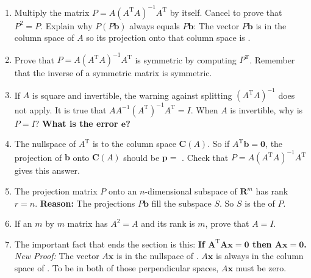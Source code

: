 \documentclass[14pt, a4paper]{article}
\begin{document}
\begin{enumerate}[resume]
    \item Multiply the matrix $P = A(A^{\mathrm{T}}A)^{-1}A^{\mathrm{T}}$ by itself. Cancel to prove that $P^2 = P$. Explain why $P(P\boldsymbol{b})$ always equals $P\boldsymbol{b}$: The vector $P\boldsymbol{b}$ is in the column space of $A$ so its projection onto that column space is \underline{\hspace{2cm}}.

    \item Prove that $P = A(A^{\mathrm{T}}A)^{-1}A^{\mathrm{T}}$ is symmetric by computing $P^{\mathrm{T}}$. Remember that the inverse of a symmetric matrix is symmetric.

    \item If $A$ is square and invertible, the warning against splitting $(A^{\mathrm{T}}A)^{-1}$ does not apply. It is true that $AA^{-1}(A^{\mathrm{T}})^{-1}A^{\mathrm{T}} = I$. When $A$ is invertible, why is $P = I$? \textbf{What is the error $\boldsymbol{e}$?}

    \item The nullspace of $A^{\mathrm{T}}$ is \underline{\hspace{2cm}} to the column space $\mathbf{C}(A)$. So if $A^{\mathrm{T}}\boldsymbol{b} = \boldsymbol{0}$, the projection of $\boldsymbol{b}$ onto $\mathbf{C}(A)$ should be $\boldsymbol{p} = $ \underline{\hspace{2cm}}. Check that $P = A(A^{\mathrm{T}}A)^{-1}A^{\mathrm{T}}$ gives this answer.

    \item The projection matrix $P$ onto an $n$-dimensional subspace of $\mathbf{R}^m$ has rank $r = n$. \textbf{Reason:} The projections $P\boldsymbol{b}$ fill the subspace $S$. So $S$ is the \underline{\hspace{2cm}} of $P$.

    \item If an $m$ by $m$ matrix has $A^2 = A$ and its rank is $m$, prove that $A = I$.

    \item The important fact that ends the section is this: \textbf{If $\boldsymbol{A^{\mathrm{T}}A\boldsymbol{x} = \boldsymbol{0}}$ then $\boldsymbol{A\boldsymbol{x} = \boldsymbol{0}}$.} \\
          \emph{New Proof:} The vector $A\boldsymbol{x}$ is in the nullspace of \underline{\hspace{2cm}}. $A\boldsymbol{x}$ is always in the column space of \underline{\hspace{2cm}}. To be in both of those perpendicular spaces, $A\boldsymbol{x}$ must be zero.


\end{enumerate}
\end{document}
